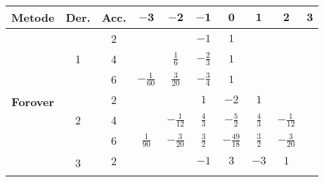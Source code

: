 \begin{table}[H]
    \centering
    \setlength{\tabcolsep}{5pt}
    \renewcommand{\arraystretch}{1.2}
    \begin{tabular}{|c|c|c|c|c|c|c|c|c|c|}
        \hline
        \rowcolor{cyan!20} \textbf{\footnotesize{Metode}} & \textbf{\footnotesize{Der.}} & \textbf{\footnotesize Acc.} & $\mathbf{-3}$    & $\mathbf{-2}$    & $\mathbf{-1}$   & $\mathbf{0}$     & $\mathbf{1}$      & $\mathbf{2}$       & $\mathbf{3}$     \\ \hline

        \multirow{12}{*}{\textbf{\footnotesize{Forover}}}
                                                          & \multirow{3}{*}{1}           & 2                           &                  &                  & $-1$            & $1$              &                   &                    &                  \\ \cline{3-10}
                                                          &                              & 4                           &                  & $\frac{1}{6}$    & $-\frac{2}{3}$  & $1$              &                   &                    &                  \\ \cline{3-10}
                                                          &                              & 6                           & $-\frac{1}{60}$  & $\frac{3}{20}$   & $-\frac{3}{4}$  & $1$              &                   &                    &                  \\ \cline{2-10}
                                                          & \multirow{3}{*}{2}           & 2                           &                  &                  & $1$             & $-2$             & $1$               &                    &                  \\ \cline{3-10}
                                                          &                              & 4                           &                  & $-\frac{1}{12}$  & $\frac{4}{3}$   & $-\frac{5}{2}$   & $\frac{4}{3}$     & $-\frac{1}{12}$    &                  \\ \cline{3-10}
                                                          &                              & 6                           & $\frac{1}{90}$   & $-\frac{3}{20}$  & $\frac{3}{2}$   & $-\frac{49}{18}$ & $\frac{3}{2}$     & $-\frac{3}{20}$    &                  \\ \cline{2-10}
                                                          & \multirow{3}{*}{3}           & 2                           &                  &                  & $-1$            & $3$              & $-3$              & $1$                &                  \\ \cline{3-10}

\end{tabular}
\end{table}
